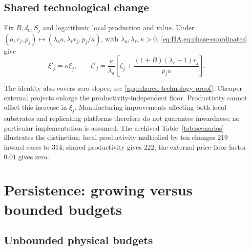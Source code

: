 \begin{samepage}
\subsection{Shared technological change}
\begin{corollary}
\label{cor:shared-technology}
Fix $B,d_0,S_j$ and logarithmic local production and value. Under
$(a,r_j,p_j)\mapsto(\lambda_a a,\lambda_r r_j,p_j/\kappa)$, with
$\lambda_a,\lambda_r,\kappa>0$, \cref{eq:HA,eq:phase-coordinates} give
\begin{equation}
 \xi'_j=\kappa\xi_j,\qquad
 \zeta'_j=\frac{\kappa}{\lambda_a}
 \left[\zeta_j+\frac{(1+B)(\lambda_r-1)r_j}{p_ja}\right].
 \label{eq:shared-technology}
\end{equation}
\end{corollary}
\end{samepage}
The identity also covers zero slopes; see \cref{app:shared-technology-proof}.
Cheaper external projects enlarge the productivity-independent floor.
Productivity cannot offset this increase in $\xi_j$.
Manufacturing improvements affecting both local substrates and replicating
platforms therefore do not guarantee inwardness; no particular implementation
is assumed. The archived Table~\ref{tab:scenarios} illustrates the distinction:
local productivity multiplied by ten changes 219 inward cases to 314;
shared productivity gives 222; the external price-floor factor $0.01$ gives zero.

\section{Persistence: growing versus bounded budgets}
\label{sec:persistence}

\subsection{Unbounded physical budgets}

